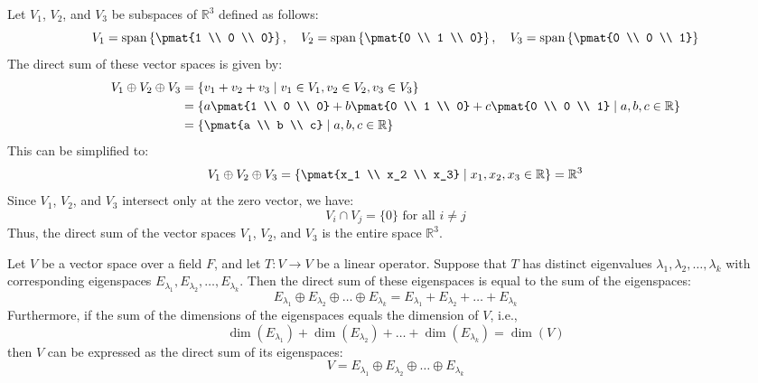 \documentclass[openany]{book}
\begin{document}
\begin{example}
    Let $V_1$, $V_2$, and $V_3$ be subspaces of $\mathbb{R}^3$ defined as follows:
    $$V_1 = \text{span}\left\{\pmat{1 \\ 0 \\ 0}\right\}, \quad V_2 = \text{span}\left\{\pmat{0 \\ 1 \\ 0}\right\}, \quad V_3 = \text{span}\left\{\pmat{0 \\ 0 \\ 1}\right\}$$
    The direct sum of these vector spaces is given by:
    \[\begin{aligned}
    V_1 \oplus V_2 \oplus V_3 &= \left\{ v_1 + v_2 + v_3 \mid v_1 \in V_1, v_2 \in V_2, v_3 \in V_3 \right\} \\
    &= \left\{ a\pmat{1 \\ 0 \\ 0} + b\pmat{0 \\ 1 \\ 0} + c\pmat{0 \\ 0 \\ 1} \mid a, b, c \in \mathbb{R} \right\} \\
    &= \left\{ \pmat{a \\ b \\ c} \mid a, b, c \in \mathbb{R} \right\}
    \end{aligned}\]
    This can be simplified to:
    $$V_1 \oplus V_2 \oplus V_3 = \left\{ \pmat{x_1 \\ x_2 \\ x_3} \mid x_1, x_2, x_3 \in \mathbb{R} \right\} = \mathbb{R}^3$$
    Since $V_1$, $V_2$, and $V_3$ intersect only at the zero vector, we have:
    $$V_i \cap V_j = \{0\} \text{ for all } i \neq j$$
    Thus, the direct sum of the vector spaces $V_1$, $V_2$, and $V_3$ is the entire space $\mathbb{R}^3$.
\end{example}
\begin{mytheorem}
    Let $V$ be a vector space over a field $F$, and let $T: V \to V$ be a linear operator. Suppose that $T$ has distinct eigenvalues $\lambda_1, \lambda_2, \ldots, \lambda_k$ with corresponding eigenspaces $E_{\lambda_1}, E_{\lambda_2}, \ldots, E_{\lambda_k}$. Then the direct sum of these eigenspaces is equal to the sum of the eigenspaces:
    $$E_{\lambda_1} \oplus E_{\lambda_2} \oplus \ldots \oplus E_{\lambda_k} = E_{\lambda_1} + E_{\lambda_2} + \ldots + E_{\lambda_k}$$
    Furthermore, if the sum of the dimensions of the eigenspaces equals the dimension of $V$, i.e.,
    $$\dim(E_{\lambda_1}) + \dim(E_{\lambda_2}) + \ldots + \dim(E_{\lambda_k}) = \dim(V)$$
    then $V$ can be expressed as the direct sum of its eigenspaces:
    $$V = E_{\lambda_1} \oplus E_{\lambda_2} \oplus \ldots \oplus E_{\lambda_k}$$
\end{mytheorem}
\end{document}

